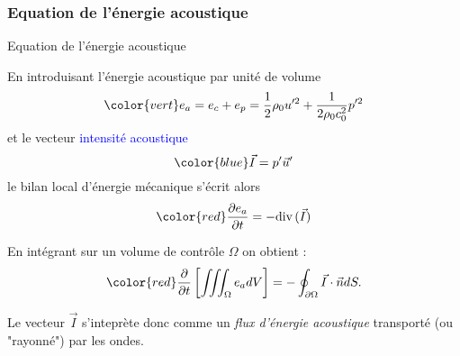 \subsubsection{Equation de l'énergie acoustique}
\begin{frame}{Equation de l'énergie acoustique}

\small

En introduisant l'\textcolor{vert}{énergie acoustique} par unité de volume
\[
	\color{vert}
	e_a = e_c + e_p = \frac{1}{2} \rho_0 u'^2 + \frac{1}{2\rho_0 c_0^2} p'^2
\]
\pause
et le vecteur \textcolor{blue}{intensité acoustique} 
\[
	\color{blue}
	\vec{I} = p' \vec{u}'
\]
\pause
le bilan local d'énergie mécanique s'écrit alors
\[
	\color{red}
	\dpdt{e_a} = - \divergence (\vec{I})	
\]

\pause

En intégrant sur un volume de contrôle $\Omega$ on obtient :
\[
\color{red}
\dpdt{}  \left[ \iiint_{\Omega} e_a dV \right] = - \oint_{\partial \Omega } \vec{I} \cdot \vec{n} dS. 
\]

\pause
Le vecteur $\vec {I}$ s'inteprète donc comme un {\em flux d'énergie acoustique} transporté (ou "rayonné") par les ondes. 


\end{frame}

